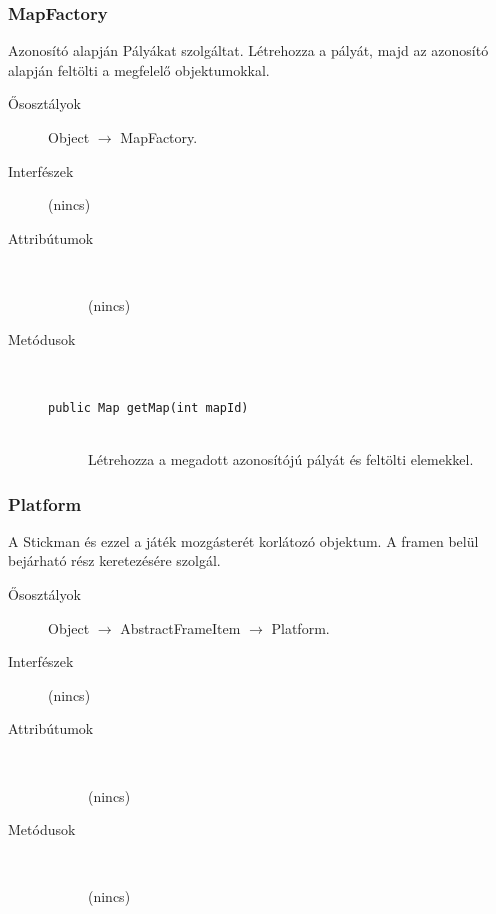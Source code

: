 		\subsubsection{MapFactory}
				 Azonosító alapján Pályákat szolgáltat.  Létrehozza a pályát, majd az azonosító alapján feltölti  a megfelelő objektumokkal. 			\begin{description}


				\item[Ősosztályok] Object $\rightarrow{}$ MapFactory.
				\item[Interfészek] (nincs)
				\item[Attribútumok]$\ $
					\begin{description}
						\item[] (nincs)
					\end{description}
				\item[Metódusok]$\ $
					\begin{description}
						\item[\texttt{public Map getMap(int mapId)}] \hfill \\ Létrehozza a megadott azonosítójú pályát  és feltölti elemekkel. 
					\end{description}
			\end{description}

		\subsubsection{Platform}
				 A Stickman és ezzel a játék mozgásterét korlátozó objektum. A framen belül bejárható rész keretezésére szolgál. 			\begin{description}


				\item[Ősosztályok] Object $\rightarrow{}$ AbstractFrameItem $\rightarrow{}$ Platform.
				\item[Interfészek] (nincs)
				\item[Attribútumok]$\ $
					\begin{description}
						\item[] (nincs)
					\end{description}
				\item[Metódusok]$\ $
					\begin{description}
						\item[] (nincs)
					\end{description}
			\end{description}

